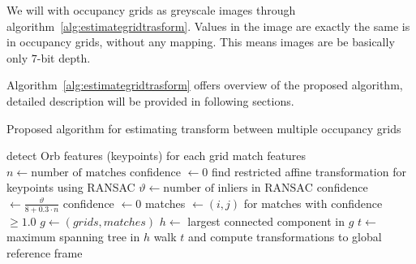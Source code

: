We will with occupancy grids as greyscale images through algorithm~\ref{alg:estimategridtrasform}. Values in the image are exactly the same is in occupancy grids, without any mapping. This means images are be basically only $7$-bit depth.

Algorithm~\ref{alg:estimategridtrasform} offers overview of the proposed algorithm, detailed description will be provided in following sections.

\begin{algorithm}
    \caption{Proposed algorithm for estimating transform between multiple occupancy grids}
    \label{alg:estimategridtrasform}
    \begin{algorithmic}[1]
            \State detect Orb features (keypoints) for each grid
             
            	\State match features
            	\State $n \gets \text{number of matches}$
            		\State confidence $\gets 0$
            	\Else
            		\State find restricted affine transformation for keypoints using RANSAC
            		\State $\vartheta \gets \text{number of inliers in RANSAC}$
            			\State confidence $\gets \frac{\vartheta}{8 + 0.3 \cdot n}$
            		\Else
            			\State confidence $\gets 0$
            		\EndIf
            	\EndIf
            \EndFor
            \State matches $\gets (i,j)$ for matches with confidence $\ge 1.0$
            \State $g \gets (grids, matches)$
            \State $h \gets$ largest connected component in $g$
            \State $t \gets$ maximum spanning tree in $h$
            \State walk $t$ and compute transformations to global reference frame
        \EndProcedure
    \end{algorithmic}
\end{algorithm}